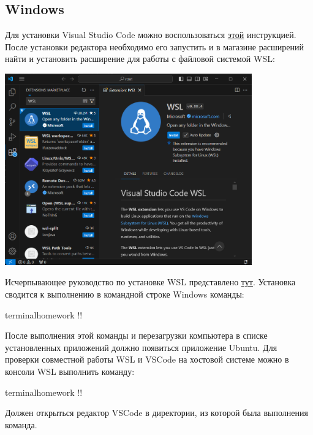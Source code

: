 \documentclass[14pt]{extarticle}
\begin{document}
\subsection{Windows}

Для установки Visual Studio Code можно воспользоваться
\href{https://code.visualstudio.com/docs/setup/windows#_installation}{этой}
инструкцией.
После установки редактора необходимо его запустить и в магазине расширений найти и установить
расширение для работы с файловой системой WSL:

\begin{center}
    \includegraphics[width=0.8\textwidth]{Homeworks/1-Hello-World/wsl-extension.png}
\end{center}

Исчерпывающее руководство по установке WSL представлено
\href{https://learn.microsoft.com/ru-ru/windows/wsl/setup/environment}{тут}.
Установка сводится к выполнению в командной строке Windows команды:

\begin{terminalwindow}{terminalhomework}
!!
\end{terminalwindow}

После выполнения этой команды и перезагрузки компьютера в списке установленных приложений
должно появиться приложение Ubuntu.
Для проверки совместной работы WSL и VSCode на хостовой системе можно в консоли WSL выполнить
команду:

\begin{terminalwindow}{terminalhomework}
!!
\end{terminalwindow}

Должен открыться редактор VSCode в директории, из которой была выполнения команда.
\end{document}
